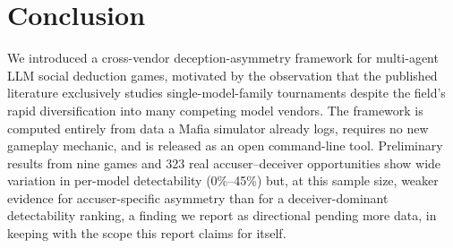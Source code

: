 \documentclass{article}
\begin{document}
\section{Conclusion}
\label{sec:conclusion}

We introduced a cross-vendor deception-asymmetry framework for multi-agent LLM social deduction games, motivated by the observation that the published literature exclusively studies single-model-family tournaments despite the field's rapid diversification into many competing model vendors. The framework is computed entirely from data a Mafia simulator already logs, requires no new gameplay mechanic, and is released as an open command-line tool. Preliminary results from nine games and 323 real accuser--deceiver opportunities show wide variation in per-model detectability (0\%--45\%) but, at this sample size, weaker evidence for accuser-specific asymmetry than for a deceiver-dominant detectability ranking, a finding we report as directional pending more data, in keeping with the scope this report claims for itself.
\end{document}
